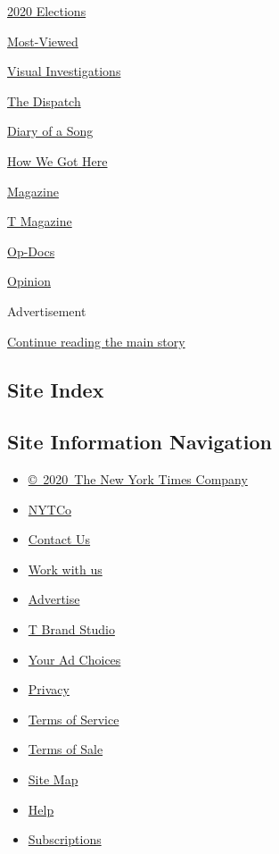 \href{/video/2020-Elections}{2020 Elections}

\href{/video/Most-Viewed}{Most-Viewed}

\href{/video/investigations}{Visual Investigations}

\href{/video/on-the-ground}{The Dispatch}

\href{/video/diaryofasong}{Diary of a Song}

\href{/video/how-we-got-here}{How We Got Here}

\href{/video/magazine}{Magazine}

\href{/video/t-magazine}{T Magazine}

\href{/video/op-docs}{Op-Docs}

\href{/video/opinion}{Opinion}

Advertisement

\protect\hyperlink{after-bottom}{Continue reading the main story}

\hypertarget{site-index}{%
\subsection{Site Index}\label{site-index}}

\hypertarget{site-information-navigation}{%
\subsection{Site Information
Navigation}\label{site-information-navigation}}

\begin{itemize}
\tightlist
\item
  \href{https://help.nytimes.com/hc/en-us/articles/115014792127-Copyright-notice}{©~2020~The
  New York Times Company}
\end{itemize}

\begin{itemize}
\tightlist
\item
  \href{https://www.nytco.com/}{NYTCo}
\item
  \href{https://help.nytimes.com/hc/en-us/articles/115015385887-Contact-Us}{Contact
  Us}
\item
  \href{https://www.nytco.com/careers/}{Work with us}
\item
  \href{https://nytmediakit.com/}{Advertise}
\item
  \href{http://www.tbrandstudio.com/}{T Brand Studio}
\item
  \href{https://www.nytimes.com/privacy/cookie-policy\#how-do-i-manage-trackers}{Your
  Ad Choices}
\item
  \href{https://www.nytimes.com/privacy}{Privacy}
\item
  \href{https://help.nytimes.com/hc/en-us/articles/115014893428-Terms-of-service}{Terms
  of Service}
\item
  \href{https://help.nytimes.com/hc/en-us/articles/115014893968-Terms-of-sale}{Terms
  of Sale}
\item
  \href{https://spiderbites.nytimes.com}{Site Map}
\item
  \href{https://help.nytimes.com/hc/en-us}{Help}
\item
  \href{https://www.nytimes.com/subscription?campaignId=37WXW}{Subscriptions}
\end{itemize}
